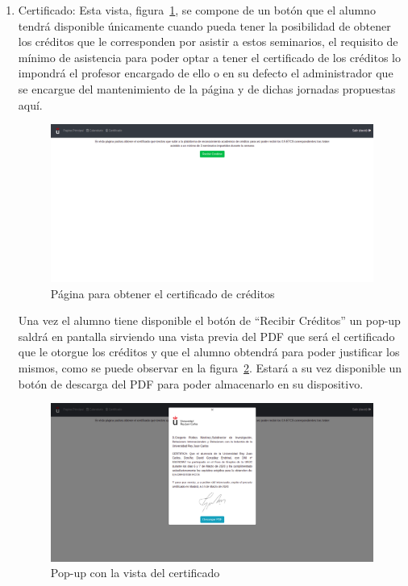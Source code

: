 \documentclass[a4paper, 12pt]{book}
\begin{document}
\begin{enumerate}
  \item Certificado: Esta vista, figura~\ref{fig:recibirCred}, se compone de un botón que el alumno tendrá disponible únicamente cuando pueda tener la posibilidad de obtener los créditos que le corresponden por asistir a estos seminarios, el requisito de mínimo de asistencia para poder optar a tener el certificado de los créditos lo impondrá el profesor encargado de ello o en su defecto el administrador que se encargue del mantenimiento de la página y de dichas jornadas propuestas aquí. 
  
    \begin{figure}[h!]
  	\centering
  	\includegraphics[width=16cm, keepaspectratio]{img/recibirCred.png}
  	\caption{Página para obtener el certificado de créditos}\label{fig:recibirCred}
	\end{figure}
  
  
  Una vez el alumno tiene disponible el botón de ``Recibir Créditos'' un pop-up saldrá en pantalla sirviendo una vista previa del PDF que será el certificado que le otorgue los créditos y que el alumno obtendrá para poder justificar los mismos, como se puede observar en la figura~\ref{fig:pdfVisual}. Estará a su vez disponible un botón de descarga del PDF para poder almacenarlo en su dispositivo.
  
      \begin{figure}[h!]
  	\centering
  	\includegraphics[width=16cm, keepaspectratio]{img/pdfVisual.png}
  	\caption{Pop-up con la vista del certificado}\label{fig:pdfVisual}
	\end{figure}
  
\end{enumerate}
\end{document}
